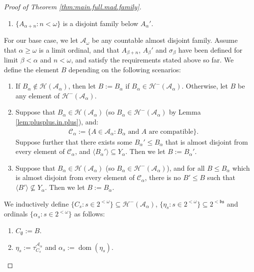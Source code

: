 \documentclass[11pt,reqno]{amsart}
\theoremstyle{plain}
\numberwithin{equation}{section}
\theoremstyle{definition}
\newcommand{\func}{\operatorname}
\renewcommand{\c}[1]{\langle #1 \rangle}
\newcommand{\cal}{\mathcal}
\renewcommand{\frak}{\mathfrak}
\newcommand{\dom}{\func{dom}}
\newcommand{\A}{\cal{A}}
\renewcommand{\H}{\cal{H}}
\begin{document}
\begin{proof}[Proof of Theorem \ref{thm:main.full.mad.family}]
\begin{enumerate}
        \item $\{A_{\alpha+n} : n < \omega\}$ is a disjoint family below $A_\alpha'$.
    \end{enumerate}
    For our base case, we let $\A_\omega$ be any countable almost disjoint family. Assume that $\alpha \geq \omega$ is a limit ordinal, and that $A_{\beta+n}$, $A_\beta'$ and $\sigma_\beta$ have been defined for limit $\beta < \alpha$ and $n < \omega$, and satisfy the requirements stated above so far. We define the element $B$ depending on the following scenarios:
    \begin{enumerate}[label=(\alph*)]
        \item If $B_\alpha \notin \H(\A_\alpha)$, then let $B := B_\alpha$ if $B_\alpha \in \H^-(\A_\alpha)$. Otherwise, let $B$ be any element of $\H^-(\A_\alpha)$.

        \item Suppose that $B_\alpha \in \H(\A_\alpha)$ (so $B_\alpha \in \H^-(\A_\alpha)$ by Lemma \ref{lem:plusplus.in.plus}), and:
        \begin{align*}
            \cal{C}_\alpha := \{A \in \A_\alpha : B_\alpha \text{ and } A \text{ are compatible}\}.
        \end{align*}
        Suppose further that there exists some $B_\alpha' \leq B_\alpha$ that is almost disjoint from every element of $\cal{C}_\alpha$, and $\c{B_\alpha'} \subseteq Y_\alpha$. Then we let $B := B_\alpha'$.

        \item Suppose that $B_\alpha \in \H(\A_\alpha)$ (so $B_\alpha \in \H^-(\A_\alpha)$), and for all $B \leq B_\alpha$ which is almost disjoint from every element of $\cal{C}_\alpha$, there is no $B' \leq B$ such that $\c{B'} \not\subseteq Y_\alpha$. Then we let $B := B_\alpha$.
    \end{enumerate}
    We inductively define $\{C_s : s \in 2^{<\omega}\} \subseteq \H^-(\A_\alpha)$, $\{\eta_s : s \in 2^{<\omega}\} \subseteq 2^{<\frak{bs}}$ and ordinals $\{\alpha_s : s \in 2^{<\omega}\}$ as follows:
    \begin{enumerate}
        \item $C_\emptyset := B$.

        \item $\eta_s := \tau_{C_s}^{\A_\alpha}$ and $\alpha_s := \dom(\eta_s)$.


\end{enumerate}
\end{proof}
\end{document}
